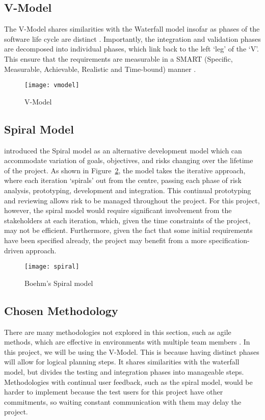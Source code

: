 \subsection{V-Model}
The V-Model shares similarities with the Waterfall model insofar as phases of the software life cycle are distinct \cite{agile}. Importantly, the integration and validation phases are decomposed into individual phases, which link back to the left `leg' of the `V'. This ensure that the requirements are measurable in a SMART (Specific, Measurable, Achievable, Realistic and Time-bound) \cite{smart} manner \cite{sdlc2010}.
\begin{figure}
	\centering
	\texttt{[image: vmodel]}
	\caption{V-Model}
	\label{fig:vmodel}
\end{figure}

\subsection{Spiral Model}
\label{sec:spiral}
\citet{boehm} introduced the Spiral model as an alternative development model which can accommodate variation of goals, objectives, and risks changing over the lifetime of the project. As shown in Figure~\ref{fig:spiral}, the model takes the iterative approach, where each iteration `spirals' out from the centre, passing each phase of risk analysis, prototyping, development and integration. This continual prototyping and reviewing allows risk to be managed throughout the project. For this project, however, the spiral model would require significant involvement from the stakeholders at each iteration, which, given the time constraints of the project, may not be efficient. Furthermore, given the fact that some initial requirements have been specified already, the project may benefit from a more specification-driven approach.

	\begin{figure}
	\centering
	\texttt{[image: spiral]}
	\caption{Boehm's Spiral model \cite{boehm}}
	\label{fig:spiral}
	\end{figure}

\subsection{Chosen Methodology}
There are many methodologies not explored in this section, such as agile methods, which are effective in environments with multiple team members \cite{agile}. In this project, we will be using the V-Model. This is because having distinct phases will allow for logical planning steps. It shares similarities with the waterfall model, but divides the testing and integration phases into manageable steps. Methodologies with continual user feedback, such as the spiral model, would be harder to implement because the test users for this project have other commitments, so waiting constant communication with them may delay the project.

